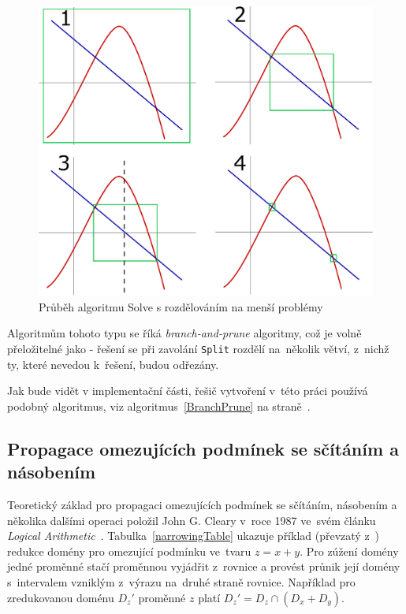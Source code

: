 \begin{figure}
\centering
\includegraphics[scale=.68]{img/solving.eps}
\caption{Průběh algoritmu Solve s rozdělováním na menší problémy}
\label{img:solving}
\end{figure}

Algoritmům tohoto typu se říká \emph{branch-and-prune} algoritmy, což je volně přeložitelné jako  - řešení se při zavolání \verb|Split| rozdělí na~několik větví, z~nichž ty, které nevedou k~řešení, budou odřezány.

Jak bude vidět v implementační části, řešič vytvoření v~této práci používá podobný algoritmus, viz algoritmus~\ref{BranchPrune} na straně~\pageref{BranchPrune}.







\subsection{Propagace omezujících podmínek se sčítáním a násobením}
\label{ch:narrowingHowWorks}
Teoretický základ pro propagaci omezujících podmínek se sčítáním, násobením a několika dalšími operaci položil John G. Cleary v~roce 1987 ve~svém článku \emph{Logical Arithmetic}~\cite{cleary87}. Tabulka~\ref{narrowingTable} ukazuje příklad (převzatý z~\cite{cleary87}) redukce domény pro omezující podmínku ve~tvaru $z = x + y$. Pro zúžení domény jedné proměnné stačí proměnnou vyjádřit z~rovnice a provést průnik její domény s~intervalem vzniklým z~výrazu na~druhé straně rovnice. Například pro zredukovanou doménu $D_z'$ proměnné $z$ platí $D_z' = D_z \cap (D_x + D_y)$.



